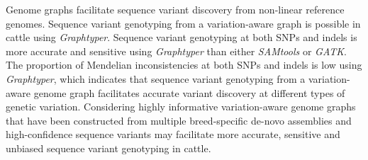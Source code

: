 \documentclass[../main.tex]{subfiles}
\begin{document}
Genome graphs facilitate sequence variant discovery from non-linear reference genomes. Sequence variant genotyping from a variation-aware graph is possible in cattle using \emph{Graphtyper}. Sequence variant genotyping at both SNPs and indels is more accurate and sensitive using \emph{Graphtyper} than either \emph{SAMtools} or \emph{GATK}. The proportion of Mendelian inconsistencies at both SNPs and indels is low using \emph{Graphtyper}, which indicates that sequence variant genotyping from a variation-aware genome graph facilitates accurate variant discovery at different types of genetic variation. Considering highly informative variation-aware genome graphs that have been constructed from multiple breed-specific de-novo assemblies and high-confidence sequence variants may facilitate more accurate, sensitive and unbiased sequence variant genotyping in cattle.

%


\singlespacing
\footnotesize




\ifdefined\BuildingFromMainFile
\else
   
\end{document}
